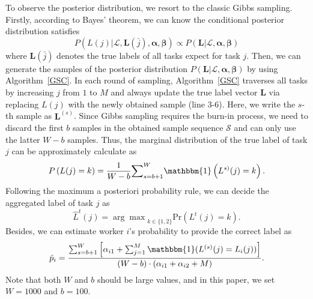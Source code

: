 \documentclass{article}
\begin{document}
To observe the posterior distribution, we resort to the classic Gibbs sampling. Firstly, according to Bayes' theorem, we can know the conditional posterior distribution satisfies
\begin{equation}
P(L(j)|\mathcal{L}, \bm{L}(\bar{j}), \bm{\alpha}, \bm{\beta})\propto P(\bm{L}|\mathcal{L}, \bm{\alpha}, \bm{\beta})
\end{equation} 
where $\bm{L}(\bar{j})$ denotes the true labels of all tasks expect for task $j$.
Then, we can generate the samples of the posterior distribution $P(\bm{L}|\mathcal{L}, \bm{\alpha}, \bm{\beta})$ by using Algorithm~\ref{GSC}.
In each round of sampling, Algorithm~\ref{GSC} traverses all tasks by increasing $j$ from $1$ to $M$ and always update the true label vector $\bm{L}$ via replacing $L(j)$ with the newly obtained sample (line 3-6).
Here, we write the $s$-th sample as $\bm{L}^{(s)}$.
Since Gibbs sampling requires the burn-in process, we need to discard the first $b$ samples in the obtained sample sequence $\mathcal{S}$ and can only use the latter $W-b$ samples.
Thus, the marginal distribution of the true label of task $j$ can be approximately calculate as
\begin{equation}
P\left(L(j)=k\right)=\frac{1}{W-b}{\sum}_{s=b+1}^{W}\mathbbm{1}\left(L^{s)}(j)=k\right).
\end{equation}
Following the maximum a posteriori probability rule, we can decide the aggregated label of task $j$ as
\begin{equation}
\hat{L}^{t}(j)={\arg\max}_{k\in\{1,2\}}\textrm{Pr}(L^{t}(j)=k).
\end{equation}
Besides, we can estimate worker $i$'s probability to provide the correct label as
\begin{equation}
\label{p_infer}
\hat{p}_{i}=\frac{\sum_{s=b+1}^{W}\left[\alpha_{i1}+\sum_{j=1}^{M}\mathbbm{1}(L^{(s)}(j)=L_{i}(j))\right]}{(W-b)\cdot(\alpha_{i1}+\alpha_{i2}+M)}.
\end{equation}
Note that both $W$ and $b$ should be large values, and in this paper, we set $W=1000$ and $b=100$.
\end{document}
